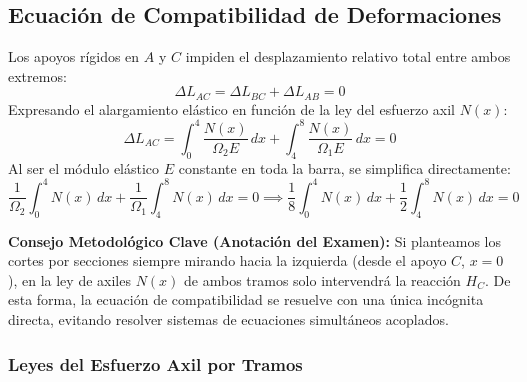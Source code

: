 \subsection{Ecuación de Compatibilidad de Deformaciones}

Los apoyos rígidos en $A$ y $C$ impiden el desplazamiento relativo total entre ambos extremos:
\begin{equation}
    \Delta L_{AC} = \Delta L_{BC} + \Delta L_{AB} = 0 \label{eq:escalonada_compatibilidad}
\end{equation}
Expresando el alargamiento elástico en función de la ley del esfuerzo axil $N(x)$:
\begin{equation}
    \Delta L_{AC} = \int_{0}^{4} \frac{N(x)}{\Omega_2 E}\,dx + \int_{4}^{8} \frac{N(x)}{\Omega_1 E}\,dx = 0
\end{equation}
Al ser el módulo elástico $E$ constante en toda la barra, se simplifica directamente:
\begin{equation}
    \frac{1}{\Omega_2} \int_{0}^{4} N(x)\,dx + \frac{1}{\Omega_1} \int_{4}^{8} N(x)\,dx = 0 \implies \frac{1}{8} \int_{0}^{4} N(x)\,dx + \frac{1}{2} \int_{4}^{8} N(x)\,dx = 0 \label{eq:escalonada_integral}
\end{equation}

\begin{tcolorbox}[colback=blue!5!white, colframe=blue!60!black, arc=3pt, boxrule=0.7pt]
    \small \textbf{Consejo Metodológico Clave (Anotación del Examen):}
    Si planteamos los cortes por secciones siempre mirando hacia la izquierda (desde el apoyo $C$, $x = 0$), en la ley de axiles $N(x)$ de ambos tramos solo intervendrá la reacción $H_C$. De esta forma, la ecuación de compatibilidad se resuelve con una única incógnita directa, evitando resolver sistemas de ecuaciones simultáneos acoplados.
\end{tcolorbox}

\subsubsection{Leyes del Esfuerzo Axil por Tramos}

